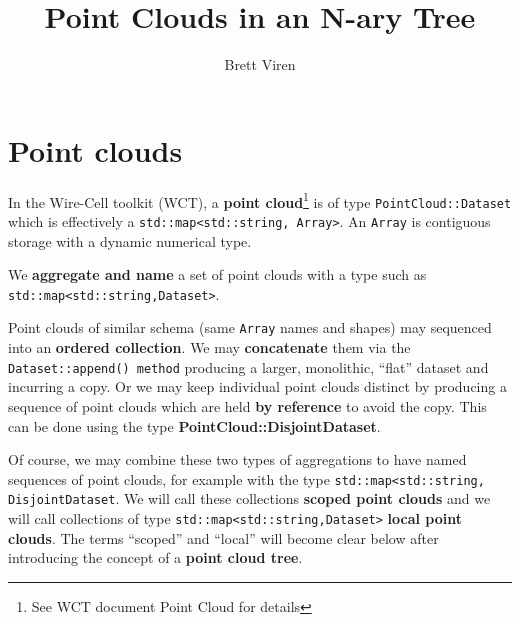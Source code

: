\documentclass{article}
\title{Point Clouds in an N-ary Tree}
\author{Brett Viren}
\begin{document}
\maketitle

\section{Point clouds}

In the Wire-Cell toolkit (WCT), a \textbf{point cloud}\footnote{See WCT document Point Cloud for details} is of type \texttt{PointCloud::Dataset} which is effectively a \texttt{std::map<std::string, Array>}.  An \texttt{Array} is contiguous storage with a dynamic numerical type.


\begin{center}
\end{center}
We \textbf{aggregate and name} a set of point clouds with a type such as \texttt{std::map<std::string,Dataset>}.

\begin{center}
\end{center}
Point clouds of similar schema (same \texttt{Array} names and shapes) may sequenced into an \textbf{ordered collection}.  We may \textbf{concatenate} them via the \texttt{Dataset::append() method} producing a larger, monolithic, ``flat'' dataset and incurring a copy.  Or we may keep individual point clouds distinct by producing a sequence of point clouds which are held \textbf{by reference} to avoid the copy.  This can be done using the type \textbf{PointCloud::DisjointDataset}.

\begin{center}
\end{center}
Of course, we may combine these two types of aggregations to have named sequences of point clouds, for example with the type \texttt{std::map<std::string, DisjointDataset}.  We will call these collections \textbf{scoped point clouds} and we will call 
collections of type \texttt{std::map<std::string,Dataset>} \textbf{local point clouds}.  The terms ``scoped'' and ``local'' will become clear below after introducing the concept of a \textbf{point cloud tree}.
\end{document}
